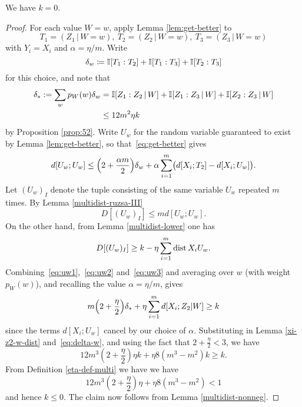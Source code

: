 \begin{proposition}\label{k-vanish}  We have $k = 0$.
\end{proposition}

\begin{proof} For each value $W=w$, apply Lemma \ref{lem:get-better} to
  \[
    T_1 = (Z_1 \,|\, W \mathop{=} w),\
    T_2 = (Z_2 \,|\, W \mathop{=} w),\
    T_3 = (Z_3 \,|\, W \mathop{=} w)
  \]
  with $Y_i=X_i$ and $\alpha=\eta/m$.  Write
  \[
    \delta_w \coloneqq \mathbb{I}[T_1 : T_2] + \mathbb{I}[T_1 : T_3] + \mathbb{I}[T_2 : T_3]
  \]
  for this choice, and note that
  \begin{align}
    \label{eq:delta-w}
    \nonumber
    \delta_\ast := \sum_w p_W(w) \delta_w &= \mathbb{I}[Z_1 : Z_2 \,|\, W] + \mathbb{I}[Z_1 : Z_3 \,|\, W] + \mathbb{I}[Z_2 : Z_3 \,|\, W] \\
                           & \leq 12 m^2 \eta k
  \end{align}
  by Proposition \ref{prop:52}.
  Write $U_w$ for the random variable guaranteed to exist by Lemma \ref{lem:get-better},
  so that~\eqref{eq:get-better} gives \begin{equation}
    \label{eq:uw1}
    d[U_w; U_w] \leq \Bigl( 2 + \frac{\alpha m}{2} \Bigr) \delta_w + \alpha \sum_{i=1}^m \bigl( d[X_i; T_2] - d[X_i; U_w] \bigr).
  \end{equation}
  Let $(U_w)_I$ denote the tuple consisting of the same variable $U_w$ repeated $m$ times.
  By Lemma \ref{multidist-ruzsa-III}
  \begin{equation}
    \label{eq:uw2}
    D[(U_w)_I] \leq m d[U_w; U_w].
  \end{equation}
  On the other hand, from Lemma \ref{multidist-lower} one has
  \begin{equation}
    \label{eq:uw3}
    D[(U_w)_I] \geq k - \eta \sum_{i=1}^m \operatorname{dist}{X_i}{U_w}.
  \end{equation}
  Combining~\eqref{eq:uw1},~\eqref{eq:uw2} and~\eqref{eq:uw3} and averaging over $w$ (with weight $p_W(w)$), and recalling the value $\alpha=\eta/m$, gives
  \[
     m \Bigl( 2 + \frac{\eta}{2} \Bigr) \delta_\ast + \eta \sum_{i=1}^m d[X_i; Z_2 | W]
    \geq k
  \]
  since the terms $d[X_i; U_w]$ cancel by our choice of $\alpha$.
  Substituting in Lemma \ref{xi-z2-w-dist} and~\eqref{eq:delta-w}, and using the fact that $2 + \frac{\eta}{2} < 3$, we have
  \[
    12 m^3 (2+\frac{\eta}{2}) \eta k + \eta 8(m^3-m^2) k \geq k.
  \]
  From Definition \ref{eta-def-multi} we have we have
  $$ 12 m^3 (2+\frac{\eta}{2}) \eta + \eta 8(m^3-m^2) < 1$$
  and hence $k \leq 0$.  The claim now follows from Lemma \ref{multidist-nonneg}.
\end{proof}

